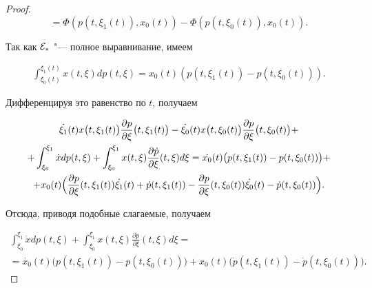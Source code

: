 \begin{proof}
\begin{equation}
=\Phi(p(t,\xi_1(t)),x_0(t))-\Phi(p(t,\xi_0(t)),x_0(t)).

\label{eq-SupportiveForProof-E*St-is-D'-4}

\end{equation}

Так как ${\cal E}_*$ "--- полное выравнивание, имеем

\begin{gather}

\int _{\xi_0(t)}^{\xi_1(t)}x(t,\xi)dp(t,\xi)=x_0(t)(p(t,\xi_1(t))-p(t,\xi_0(t))).\label{eq-SupportiveForProof-E*St-is-D'-5}

\end{gather}

Дифференцируя это равенство по $t$, получаем

\begin{multline}

\dot{\xi_1}(t)x \bigl(t,\xi_1(t)\bigr)\frac{\partial p}{\partial\xi} \bigl(t,\xi_1(t)\bigr)-

\dot{\xi_0}(t)x \bigl(t,\xi_0(t)\bigr)\frac{\partial p}{\partial\xi} \bigl(t,\xi_0(t)\bigr)+

\\

+\int _{\xi_0}^{\xi_1}\dot{x} dp(t,\xi)+\int _{\xi_0}^{\xi_1}x(t,\xi)

\frac{\partial\dot{p}}{\partial\xi}(t,\xi)d\xi

=

\dot{x_0}(t) \bigl(p(t,\xi_1(t))-p(t,\xi_0(t))\bigr)+

\\

+x_0(t)\Bigl(\frac{\partial p}{\partial\xi}(t,\xi_1(t))\dot{\xi_1}(t)+\dot{p}(t,\xi_1(t))-\frac{\partial p}{\partial\xi}(t,\xi_0(t))\dot{\xi_0}(t)-\dot{p}(t,\xi_0(t))\Bigr).

\end{multline}

Отсюда, приводя подобные слагаемые, получаем

\begin{multline}

\int _{\xi_0}^{\xi_1}\dot{x}dp(t,\xi)+\int _{\xi_0}^{\xi_1}x(t,\xi)\frac{\partial\dot{p}}{\partial\xi}(t,\xi)d\xi=\\

=\dot{x_0}(t) \bigl(p(t,\xi_1(t))-p(t,\xi_0(t))\bigr)+x_0(t)\bigl(\dot{p}(t,\xi_1(t))-\dot{p}(t,\xi_0(t))\bigr).

\label{eq-SupportiveForProof-E*St-is-D'-6}


\end{multline}
\end{proof}
